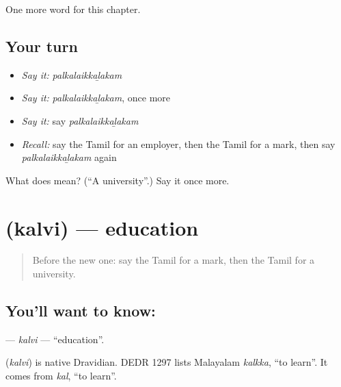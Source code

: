 \begin{grammarlens}[title={What you've built}]
One more word for this chapter.
\end{grammarlens}

\subsection*{Your turn}
\begin{itemize}
\raggedright
  \item \emph{Say it:} \emph{palkalaikkaḻakam}
  \item \emph{Say it:} \emph{palkalaikkaḻakam}, once more
  \item \emph{Say it:} say \emph{palkalaikkaḻakam}
  \item \emph{Recall:} say the Tamil for an employer, then the Tamil for a mark, then say \emph{palkalaikkaḻakam} again
\end{itemize}

\begin{tcolorbox}[breakable,colback=teal!4,colframe=teal!35!black,title={Before you move on}]
What does  mean? (\textquotedblleft{}A university\textquotedblright{}.) Say it once more.
\end{tcolorbox}
\section[\texorpdfstring{\ta{கல்வி} (kalvi)}{கல்வி (kalvi)}]{ (kalvi) — education}

\label{lesson:TA-C252-kalvi}



\begin{quote}
Before the new one: say the Tamil for a mark, then the Tamil for a university.
\end{quote}

\subsection*{You'll want to know: }
\textbf{} — \emph{kalvi} — \textquotedblleft{}education\textquotedblright{}.

\begin{cousinweb}
\textbf{} (\emph{kalvi}) is native Dravidian. DEDR 1297 lists Malayalam \emph{kalkka}, \textquotedblleft{}to learn\textquotedblright{}. It comes from \emph{kal}, \textquotedblleft{}to learn\textquotedblright{}.
\end{cousinweb}

